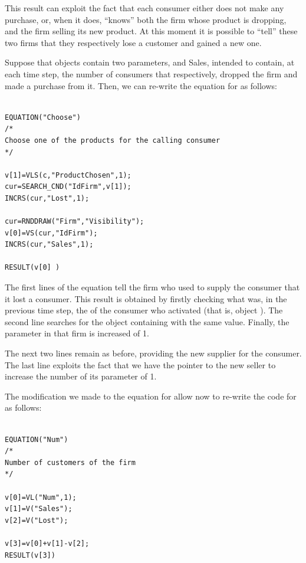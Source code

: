 \documentclass [11pt,a4paper] {book}
\begin{document}
This result can exploit the fact that each consumer either does not make any purchase, or, when it does, ``knows'' both the firm whose product is dropping, and the firm selling its new product. At this moment it is possible to ``tell'' these two firms that they respectively lose a customer and gained a new one.

Suppose that objects  contain two parameters,  and {Sales}, intended to contain, at each time step, the number of consumers that respectively, dropped the firm and made a purchase from it. Then, we can re-write the equation for  as follows:


\begin{minipage}[h]{10cm}
\small
\begin{verbatim}

EQUATION("Choose")
/*
Choose one of the products for the calling consumer
*/

v[1]=VLS(c,"ProductChosen",1);
cur=SEARCH_CND("IdFirm",v[1]);
INCRS(cur,"Lost",1);

cur=RNDDRAW("Firm","Visibility");
v[0]=VS(cur,"IdFirm");
INCRS(cur,"Sales",1);

RESULT(v[0] )

\end{verbatim}
\normalsize
\end{minipage}


The first lines of the equation tell the firm who used to supply the consumer that it lost a consumer. This result is obtained by firstly checking what was, in the previous time step, the  of the consumer who activated  (that is, object ). The second line searches for the object containing  with the same value. Finally, the parameter  in that firm is increased of 1.

The next two lines remain as before, providing the new supplier for the consumer. The last line exploits the fact that we have the pointer to the new seller to increase the number of its parameter  of 1. 

The modification we made to the equation for  allow now to re-write the code for  as follows:


\begin{minipage}[h]{10cm}
\small
\begin{verbatim}

EQUATION("Num")
/*
Number of customers of the firm
*/

v[0]=VL("Num",1);
v[1]=V("Sales");
v[2]=V("Lost");

v[3]=v[0]+v[1]-v[2];
RESULT(v[3])

\end{verbatim}
\normalsize
\end{minipage}
\end{document}

